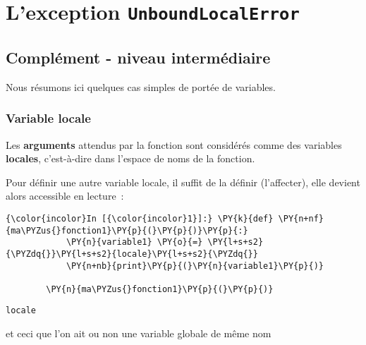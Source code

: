     
    
    
    

    

    \hypertarget{lexception-unboundlocalerror}{%
\section{\texorpdfstring{L'exception
\texttt{UnboundLocalError}}{L'exception UnboundLocalError}}\label{lexception-unboundlocalerror}}

    \hypertarget{compluxe9ment---niveau-intermuxe9diaire}{%
\subsection{Complément - niveau
intermédiaire}\label{compluxe9ment---niveau-intermuxe9diaire}}

    Nous résumons ici quelques cas simples de portée de variables.

    \hypertarget{variable-locale}{%
\subsubsection{Variable locale}\label{variable-locale}}

    Les \textbf{arguments} attendus par la fonction sont considérés comme
des variables \textbf{locales}, c'est-à-dire dans l'espace de noms de la
fonction.

Pour définir une autre variable locale, il suffit de la définir
(l'affecter), elle devient alors accessible en lecture~:

    \begin{Verbatim}[commandchars=\\\{\},frame=single,framerule=0.3mm,rulecolor=\color{cellframecolor}]
{\color{incolor}In [{\color{incolor}1}]:} \PY{k}{def} \PY{n+nf}{ma\PYZus{}fonction1}\PY{p}{(}\PY{p}{)}\PY{p}{:}
            \PY{n}{variable1} \PY{o}{=} \PY{l+s+s2}{\PYZdq{}}\PY{l+s+s2}{locale}\PY{l+s+s2}{\PYZdq{}}
            \PY{n+nb}{print}\PY{p}{(}\PY{n}{variable1}\PY{p}{)}
        
        \PY{n}{ma\PYZus{}fonction1}\PY{p}{(}\PY{p}{)}
\end{Verbatim}


    \begin{Verbatim}[commandchars=\\\{\},frame=single,framerule=0.3mm,rulecolor=\color{cellframecolor}]
locale
\end{Verbatim}

    et ceci que l'on ait ou non une variable globale de même nom

